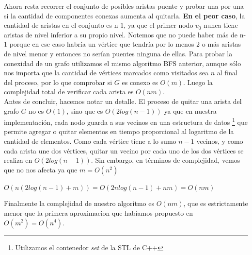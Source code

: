 Ahora resta recorrer el conjunto de posibles aristas puente y probar una por una si la cantidad de componentes conexas aumenta al quitarla. \textbf{En el peor caso}, la cantidad de aristas en el 
conjunto es n-1, ya que el primer nodo $v_0$ nunca tiene aristas de nivel inferior a su propio nivel. Notemos que no puede haber más de n-1 porque en ese caso habría un vértice que tendría 
por lo menos 2 o más aristas de nivel menor y entonces no serían puentes ninguna de ellas. Para probar la conexidad de un grafo utilizamos el mismo algoritmo BFS anterior, aunque 
sólo nos importa que la cantidad de vértices marcados como visitados sea $n$ al final del proceso, por lo que comprobar si $G$ es conexo es $O(m)$. Luego la complejidad total de verificar 
cada arista es $O(nm)$. \\
Antes de concluir, hacemos notar un detalle. El proceso de quitar una arista del grafo $G$ no es $O(1)$, sino que es $O(2 log (n-1))$ ya que en nuestra implementación, cada nodo guarda a 
sus vecinos en una estructura de datos \footnote{Utilizamos el contenedor \textit{set} de la STL de C++} que permite agregar o quitar elementos en tiempo proporcional al logaritmo de la 
cantidad de elementos. Como cada vértice tiene a lo sumo $n-1$ vecinos, y como cada arista une dos vértices, quitar un vecino por cada uno de los dos vértices se realiza en $O(2 log(n-1))$. 
Sin embargo, en términos de complejidad, vemos que no nos afecta ya que $m=O(n^2)$

\begin{center}
 $O(n(2log(n-1) + m)) = O(2nlog(n-1) + nm) = O(nm)$
\end{center}

Finalmente la complejidad de nuestro algoritmo es $O(nm)$, que es estrictamente menor que la primera aproximacion que habíamos propuesto en $O(m^2) = O(n^4)$.